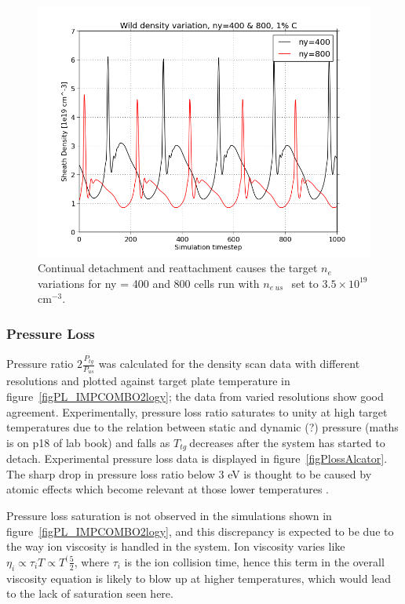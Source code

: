 \documentclass[11pt]{article}  %
\providecommand{\noNe}[1]{{${#1}\times 10^{19}$ cm$^{-3}$}} %
\providecommand{\neus}{$n_{e~us}~$} %
\providecommand{\Ttg}{$T_{tg}~$} %
\begin{document}
\begin{figure}
\includegraphics[scale=0.5]{Figures/sol1d/ny400800r35netg.png}
\centering
\caption{Continual detachment and reattachment causes the target $n_e$ variations for ny = 400 and 800 cells run with \neus~set to \noNe{3.5}.}\label{figny400800r35netg}
\end{figure}


\subsubsection{Pressure Loss}\label{sssecPloss}
Pressure ratio $2\frac{P_{tg}}{P_{us}}$ was calculated for the density scan data with different resolutions and plotted against target plate temperature in figure~\ref{figPL_IMPCOMBO2logy}; the data from varied resolutions show good agreement. Experimentally, pressure loss ratio saturates to unity at high target temperatures due to the relation between static and dynamic (?) pressure (maths is on p18 of lab book) and falls as \Ttg decreases after the system has started to detach. Experimental pressure loss data is displayed in figure~\ref{figPlossAlcator}. The sharp drop in pressure loss ratio below 3 eV is thought to be caused by atomic effects which become relevant at those lower temperatures \cite{Pitcher1997}.

Pressure loss saturation is not observed in the simulations shown in figure~\ref{figPL_IMPCOMBO2logy}, and this discrepancy is expected to be due to the way ion viscosity is handled in the system. Ion viscosity varies like $\eta_i \propto \tau_i T \propto T^(\frac{5}{2}$, where $\tau_i$ is the ion collision time, hence this term in the overall viscosity equation is likely to blow up at higher temperatures, which would lead to the lack of saturation seen here. 
\end{document}

